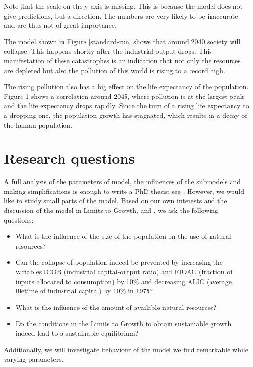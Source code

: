 \documentclass[10pt,a4paper]{scrartcl}
\begin{document}
Note that the scale on the y-axis is missing. This is because the model does not give predictions, but a direction. The numbers are very likely to be inaccurate and are thus not of great importance.

The model shown in Figure \ref{standard-run} shows that around 2040 society will collapse. This happens shortly after the industrial output drops. This manifestation of these catastrophes is an indication that not only the resources are depleted but also the pollution of this world is rising to a record high.

The rising pollution also has a big effect on the life expectancy of the population. Figure 1 shows a correlation around 2045, where pollution is at the largest peak and the life expectancy drops rapidly. Since the turn of a rising life expectancy to a dropping one, the population growth has stagnated, which results in a decay of the human population.

\section*{Research questions}

A full analysis of the parameters of model, the influences of the submodels and making simplifications is enough to write a PhD thesis: see \cite{thissen1978investigations}. However, we would like to study small parts of the model. Based on our own interests and the discussion of the model in Limits to Growth, \cite{thissen1978investigations} and \cite{vermeulen1976parameter}, we ask the following questions:

\begin{itemize}
	\item What is the influence of the size of the population on the use of natural resources?
	\item Can the collapse of population indeed be prevented by increasing the variables ICOR (industrial capital-output ratio) and FIOAC (fraction of inputs allocated to consumption) by 10\% and decreasing ALIC (average lifetime of industrial capital) by 10\% in 1975?
	\item What is the influence of the amount of available natural resources?
	\item Do the conditions in the Limits to Growth to obtain sustainable growth indeed lead to a sustainable equilibrium?
\end{itemize}

Additionally, we will investigate behaviour of the model we find remarkable while varying parameters.
\end{document}
